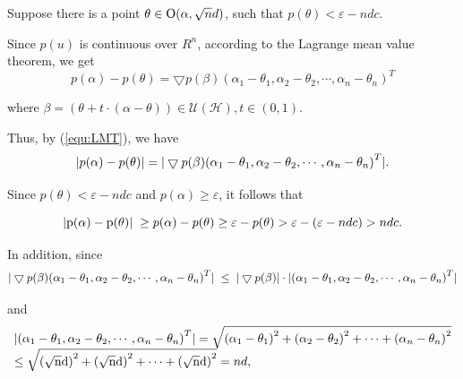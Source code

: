 Suppose there is a point $\theta  \in {\rm O}(\alpha ,\sqrt n d )$, such that $p(\theta ) < \varepsilon  - ndc$.

Since $p(u)$ is continuous over $R^n$, according to the Lagrange mean value theorem, we get
\begin{equation}\label{equ:LMT}
p(\alpha ) - p(\theta ) = \bigtriangledown p(\beta ){\left( {{\alpha _1} - {\theta _1},{\alpha _2} - {\theta _2}, \cdots ,{\alpha _n} - {\theta _n}} \right)^T}
\end{equation}

where $\beta  = (\theta  + t\cdot(\alpha  - \theta )) \in \mathcal{U(H)},t \in (0,1)$.

Thus, by (\ref{equ:LMT}), we have
\begin{equation}\label{equ:|LMT|}
{\rm{|}}p(\alpha ) - p(\theta ){\rm{|}} = {\rm{|}}\bigtriangledown p(\beta ){\left( {{\alpha _1} - {\theta _1},{\alpha _2} - {\theta _2}, \cdots ,{\alpha _n} - {\theta _n}} \right)^T}{\rm{|}}.
\end{equation}

Since $p(\theta ) < \varepsilon  - ndc$ and $p(\alpha ) \ge \varepsilon $, it follows that 

\begin{equation}\label{equ:LMT(1)}
{\rm{|p(}}\alpha {\rm{) - p(}}\theta {\rm{)|}}\; \ge p(\alpha ) - p(\theta ) \ge \varepsilon  - p(\theta ) > \varepsilon  - (\varepsilon  - ndc) > ndc.
\end{equation} 

In addition, since
\begin{equation}\label{equ:LMT(b)}
{\rm{|}}\bigtriangledown p(\beta ){\left( {{\alpha _1} - {\theta _1},{\alpha _2} - {\theta _2}, \cdots ,{\alpha _n} - {\theta _n}} \right)^T}{\rm{|}}\; \le \;{\rm{|}}\bigtriangledown p(\beta ){\rm{|\cdot|}}{\left( {{\alpha _1} - {\theta _1},{\alpha _2} - {\theta _2}, \cdots ,{\alpha _n} - {\theta _n}} \right)^T}{\rm{|}}
\end{equation}

and
\begin{equation}\label{equ:LMT(b1)}
\begin{array}{l}
{\rm{|}}{\left( {{\alpha _1} - {\theta _1},{\alpha _2} - {\theta _2}, \cdots ,{\alpha _n} - {\theta _n}} \right)^T}{\rm{|}} = \sqrt {{{{\rm{(}}{\alpha _1} - {\theta _1}{\rm{)}}}^{\rm{2}}} + {{({\alpha _2} - {\theta _2})}^2} +  \cdots  + {{({\alpha _n} - {\theta _n})}^2}}  \\
\le \sqrt {{{{\rm{(}}\sqrt {\rm{n}} {\rm{d)}}}^{\rm{2}}} + {{(\sqrt {\rm{n}} {\rm{d}})}^2} +  \cdots  + {{(\sqrt {\rm{n}} {\rm{d}})}^2}}  = nd,
\end{array}
\end{equation}

